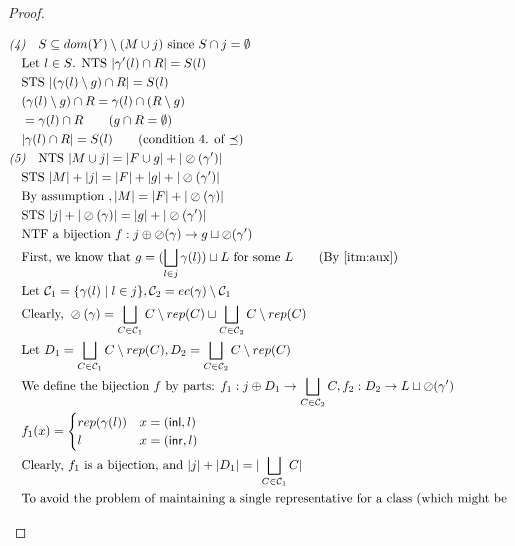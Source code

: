 \documentclass{easychair}
\newcommand{\ms}[1]{\ensuremath{\mathsf{#1}}}
\newcommand{\oh}[1]{\oslash(#1)}
\theoremstyle{definition}
\begin{document}
\begin{proof}
\begin{description}
\begin{align*}
		&\emph{(4)}\quad S \subseteq dom(Y) \setminus (M \cup j) \text{ since } S \cap j = \emptyset\\
		&\quad \text{Let } l \in S \text{. NTS } |\gamma'(l) \cap R| = S(l)\\
		&\quad \text{STS } |(\gamma(l)\setminus g) \cap R| = S(l)\\
		&\quad (\gamma(l)\setminus g) \cap R = \gamma(l) \cap (R \setminus g)\\
		&\quad = \gamma(l) \cap R \tag{$g \cap R = \emptyset$}\\
		&\quad |\gamma(l) \cap R| = S(l) \tag{condition 4. of $\preceq$}\\
		&\emph{(5)}\quad \text{NTS } |M \cup j| = |F \cup g| + |\oh{\gamma'}|\\
		&\quad \text{STS } |M| + |j| = |F| + | g| + |\oh{\gamma'}|\\
		&\quad \text{By assumption }, |M| = |F| + |\oh{\gamma}|\\
		&\quad \text{STS } |j| + |\oh{\gamma}| = |g| + |\oh{\gamma'}|\\
		&\quad \text{NTF a bijection } f : j \oplus \oh{\gamma} \to g \sqcup \oh{\gamma'}\\
		&\quad \text{First, we know that } g = (\bigsqcup_{l \in j} \gamma(l)) \sqcup L 
			\text{ for some } L \tag{By \ref{itm:aux}}\\
		&\quad \text{Let } \mathcal{C}_1 = \{\gamma(l) \mid l \in j\},
				\mathcal{C}_2 = ec(\gamma) \setminus \mathcal{C}_1\\
		&\quad \text{Clearly, } \oh{\gamma} = 
		\bigsqcup_{C  \in \mathcal{C}_1} C \setminus rep(C) \sqcup \bigsqcup_{C  \in \mathcal{C}_2} C \setminus rep(C)\\
		&\quad \text{Let } D_1 = \bigsqcup_{C  \in \mathcal{C}_1} C \setminus rep(C), 
		D_2 = \bigsqcup_{C  \in \mathcal{C}_2} C \setminus rep(C)\\
		&\quad \text{We define the bijection } 
			f \text{ by parts: } 
			f_1 : j \oplus D_1 \to \bigsqcup_{C \in \mathcal{C}_2} C, f_2 : D_2 \to L \sqcup \oh{\gamma'}\\
		&\quad f_1(x) =  
		\begin{cases}
			rep(\gamma(l)) &x = (\ms{inl},l)\\
			l &x = (\ms{inr},l)
		\end{cases}\\
		&\quad \text{Clearly, } f_1 \text{ is a bijection, and } |j| + |D_1| = |\bigsqcup_{C \in \mathcal{C}_1} C|\\
		&\quad \text{To avoid the problem of maintaining a single representative for a class (which might be 
}
\end{align*}
\end{description}
\end{proof}
\end{document}
